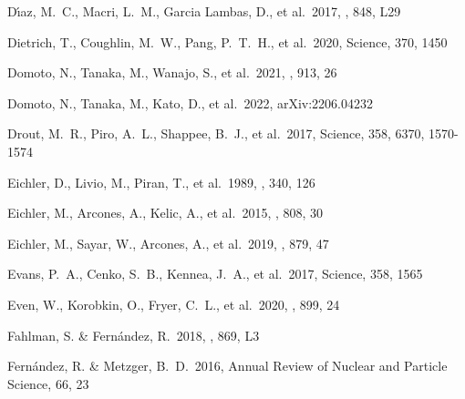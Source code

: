\documentclass[twocolumn, twocolappendix]{aastex63}
\begin{document}
\begin{thebibliography}{}
 D{\'\i}az, M.~C., Macri, L.~M., Garcia Lambas, D., et al.\ 2017, \apjl, 848, L29


 Dietrich, T., Coughlin, M.~W., Pang, P.~T.~H., et al.\ 2020, Science, 370, 1450


 Domoto, N., Tanaka, M., Wanajo, S., et al.\ 2021, \apj, 913, 26


 Domoto, N., Tanaka, M., Kato, D., et al.\ 2022, arXiv:2206.04232


 Drout, M.~R., Piro, A.~L., Shappee, B.~J., et al.\ 2017, Science, 358, 6370, 1570-1574




 Eichler, D., Livio, M., Piran, T., et al.\ 1989, \nat, 340, 126


 Eichler, M., Arcones, A., Kelic, A., et al.\ 2015, \apj, 808, 30


 Eichler, M., Sayar, W., Arcones, A., et al.\ 2019, \apj, 879, 47




 Evans, P.~A., Cenko, S.~B., Kennea, J.~A., et al.\ 2017, Science, 358, 1565


 Even, W., Korobkin, O., Fryer, C.~L., et al.\ 2020, \apj, 899, 24


 Fahlman, S. \& Fern{\'a}ndez, R.\ 2018, \apjl, 869, L3




 Fern{\'a}ndez, R. \& Metzger, B.~D.\ 2016, Annual Review of Nuclear and Particle Science, 66, 23





\end{thebibliography}
\end{document}

